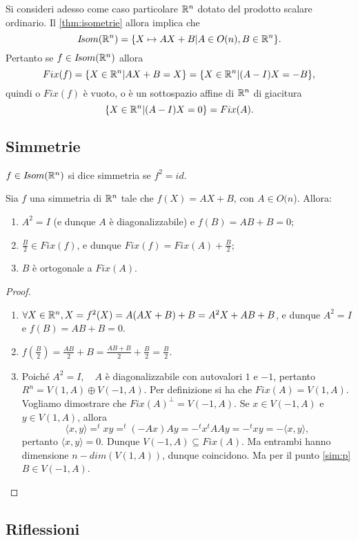  Si consideri adesso come caso particolare $\mathbb R^n$ dotato del prodotto scalare ordinario.
 Il \cref{thm:isometrie} allora implica che $$I\!som( \mathbb R^n)=\{X\mapsto AX+B|A\in O(n),B\in \mathbb R^n\}.$$
 Pertanto se $f\in I\!som( \mathbb R^n)$ allora $$Fix(f)=\{X\in \mathbb R^n|AX+B=X\}=\{X\in \mathbb R^n|(A-I)X=-B\},$$
 quindi o $Fix(f)$ è vuoto, o è un sottospazio affine di $\mathbb R^n$ di giacitura
 $$\{X\in \mathbb R^n|(A-I)X=0\}=Fix(A).$$
 
 
\subsection{Simmetrie}
 
 $f\in I\!som( \mathbb R^n)$ si dice simmetria se $f^2=id$.
 
 \begin{proposition}
 Sia $f$ una simmetria di $\mathbb R^n$ tale che $f(X)=AX+B$, con $A\in O(n$).
 Allora:
 \begin{enumerate}[label=\bf\Roman*)]
	\item $A^2=I$ (e dunque $A$ è diagonalizzabile) e $f(B)=AB+B=0$;\label{sim:p}
	\item $\frac{B}{2}\in Fix(f)$, e dunque $Fix(f)=Fix(A)+\frac{B}{2}$;
	\item $B$ è ortogonale a $Fix(A)$.
 \end{enumerate}
 \end{proposition}
 
 \begin{proof}
 \begin{enumerate}[label=\bf\Roman*)]
 \item $\forall X\in \mathbb R^n,  X=f^2(X)=A(AX+B)+B=A^2X+AB+B$, e dunque
 $A^2=I$ e $f(B)=AB+B=0$.
 \item $f(\frac{B}{2})=\frac{AB}{2}+B=\frac{AB+B}{2}+\frac{B}{2}=\frac{B}{2}$.
 \item Poiché $A^2=I,\quad A$ è diagonalizzabile con autovalori $1$ e $-1$, pertanto
 $R^n=V(1,A)\oplus V(-1,A)$. Per definizione si ha che $Fix(A)=V(1,A)$.
 Vogliamo dimostrare che $Fix(A)^{\bot}=V(-1,A)$.  Se $x\in V(-1,A)$ e $y\in V(1,A)$, allora 
  \[
   \langle x,y\rangle=^txy=^t(-Ax)Ay=-^tx^tAAy=-^txy= -\langle x,y\rangle,
  \]
 pertanto $\langle x,y\rangle=0.$
 Dunque $V(-1,A)\subseteq Fix(A)$. Ma entrambi hanno dimensione
 $n-dim(V(1,A))$, dunque coincidono.
 Ma per il punto \ref{sim:p} $B\in V(-1,A)$.
 \end{enumerate}
 \end{proof}
 
	\subsection{Riflessioni}
 
